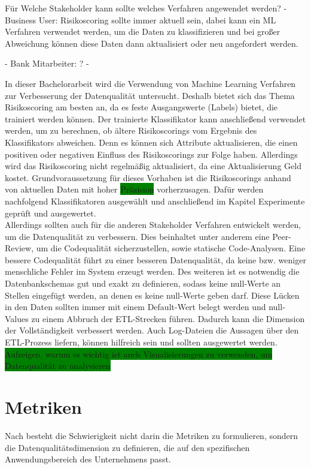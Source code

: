 Für Welche Stakeholder kann sollte welches Verfahren angewendet werden?
- Business User: Risikoscoring sollte immer aktuell sein, dabei kann ein ML Verfahren verwendet werden, um die Daten zu klassifizieren und bei großer Abweichung können diese Daten dann aktualisiert oder neu angefordert werden.

- Bank Mitarbeiter: ?
- 

In dieser Bachelorarbeit wird die Verwendung von Machine Learning Verfahren zur Verbesserung der Datenqualität untersucht.
Deshalb bietet sich das Thema Risikoscoring am besten an, da es feste Ausgangswerte (Labels) bietet, die trainiert werden können.
Der trainierte Klassifikator kann anschließend verwendet werden, um zu berechnen, ob ältere Risikoscorings vom Ergebnis des Klassifikators abweichen.
Denn es können sich Attribute aktualisieren, die einen positiven oder negativen Einfluss des Risikoscorings zur Folge haben. 
Allerdings wird das Risikoscoring nicht regelmäßig aktualisiert, da eine Aktualisierung Geld kostet.
Grundvoraussetzung für dieses Vorhaben ist die Risikoscorings anhand von aktuellen Daten mit hoher \colorbox{green}{Präzision} vorherzusagen. 
Dafür werden nachfolgend Klassifikatoren ausgewählt und anschließend im Kapitel Experimente geprüft und ausgewertet.\\
Allerdings sollten auch für die anderen Stakeholder Verfahren entwickelt werden, um die Datenqualität zu verbessern.
Dies beinhaltet unter anderem eine Peer-Review, um die Codequalität sicherzustellen, sowie statische Code-Analysen.
Eine bessere Codequalität führt zu einer besseren Datenqualität, da keine bzw. weniger menschliche Fehler im System erzeugt werden.
Des weiteren ist es notwendig die Datenbankschemas gut und exakt zu definieren, sodass keine null-Werte an Stellen eingefügt werden, an denen es keine null-Werte geben darf.
Diese Lücken in den Daten sollten immer mit einem Default-Wert belegt werden und null-Values zu einem Abbruch der ETL-Strecken führen.
Dadurch kann die Dimension der Vollständigkeit verbessert werden.
Auch Log-Dateien die Aussagen über den ETL-Prozess liefern, können hilfreich sein und sollten ausgewertet werden.
\colorbox{green}{Aufzeigen, warum es wichtig ist auch Visualisierungen zu verwenden, um Datenqualität zu analysieren}


\section{Metriken}
Nach \cite{pipino2002} besteht die Schwierigkeit nicht darin die Metriken zu formulieren, sondern die Datenqualitätsdimension zu definieren, die auf den spezifischen Anwendungsbereich des Unternehmens passt. 

